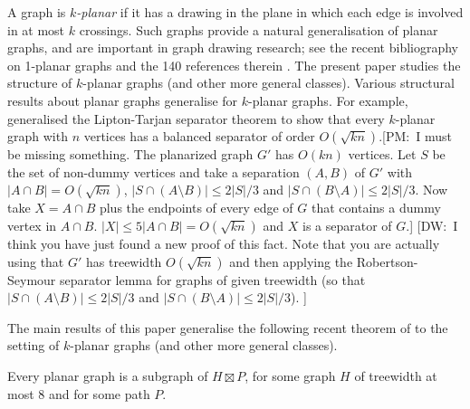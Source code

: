 \documentclass{patmorin}
\newcommand{\note}[2]{{\color{red}[#1:~#2]}}
\renewcommand{\le}{\leqslant}
\begin{document}
A graph is \emph{$k$-planar} if it has a drawing in the plane in which each edge is involved in at most $k$ crossings. Such graphs provide a natural generalisation of planar graphs, and are important in graph drawing research; see the recent bibliography on 1-planar graphs and the 140 references therein \citep{kobourov.liotta.ea:annotated}. The present paper studies the structure of $k$-planar graphs (and other more general classes). Various structural results about planar graphs generalise for $k$-planar graphs. For example, \citet{FP08} generalised the Lipton-Tarjan separator theorem to show that every $k$-planar graph with $n$ vertices has a balanced separator of order $O(\sqrt{kn})$.\note{PM}{I must be missing something.  The planarized graph $G'$ has $O(kn)$ vertices.  Let $S$ be the set of non-dummy vertices and take a separation $(A,B)$ of $G'$ with $|A\cap B|=O(\sqrt{kn})$, $|S\cap (A\setminus B)|\le 2|S|/3$ and $|S\cap (B\setminus A)|\le 2|S|/3$.  Now take $X=A\cap B$ plus the endpoints of every edge of $G$ that contains a dummy vertex in $A\cap B$.  $|X|\le 5|A\cap B|=O(\sqrt{kn})$ and $X$ is a separator of $G$.} \note{DW}{I think you have just found a new proof of this fact. Note that you are actually using that $G'$ has treewidth $O(\sqrt{kn})$ and then applying the Robertson-Seymour separator lemma for graphs of given treewidth (so that $|S\cap (A\setminus B)|\le 2|S|/3$ and $|S\cap (B\setminus A)|\le 2|S|/3$). }

The main results of this paper generalise the following recent theorem of \citet{dujmovic.joret.ea:planar} to the setting of $k$-planar graphs (and other more general classes). 

\begin{thm} 
\label{PlanarBasic}
Every planar graph is a subgraph of $H\boxtimes P$, for some graph $H$ of treewidth at most $8$ and for some path $P$. 
\end{thm}
\end{document}
